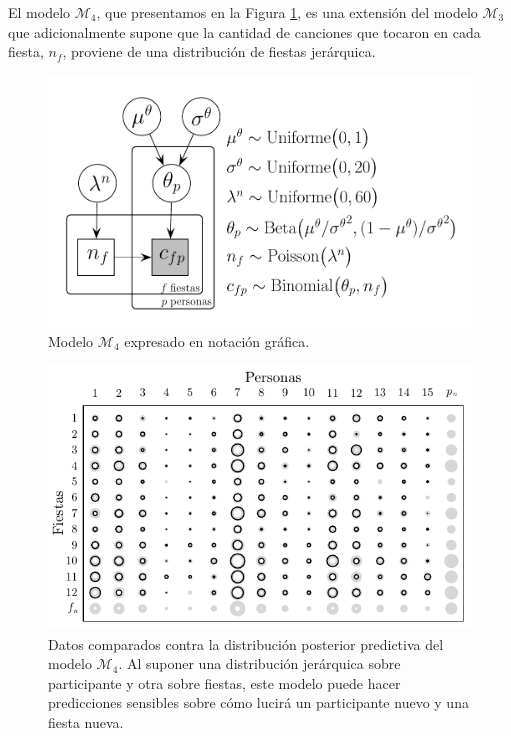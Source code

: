 \documentclass{article}
\begin{document}
\indent El modelo $\mathcal M_4$, que presentamos en la Figura \ref{fig:m_4}, es una extensión del modelo $\mathcal M_3$ que adicionalmente supone que la cantidad de canciones que tocaron en cada fiesta, $n_f$, proviene de una distribución de fiestas jerárquica. \\

\begin{figure}[H]
\centerline{\includegraphics[width=1\textwidth]{m_4.pdf}}
\caption{Modelo $\mathcal M_4$ expresado en notación gráfica.}
\label{fig:m_4}
\end{figure}

\begin{figure}[H]
\centering
\setlength\fboxsep{0pt}
\setlength\fboxrule{0.5pt}
\includegraphics[trim=0cm 0cm 0cm 0cm, clip=true, width=1\textwidth]	{data_pos_pred_m4.pdf}
\caption{Datos comparados contra la distribución posterior predictiva del modelo $\mathcal M_4$. Al suponer una distribución jerárquica sobre participante y otra sobre fiestas, este modelo puede hacer predicciones sensibles sobre cómo lucirá un participante nuevo y una fiesta nueva.}
\label{fig:data_4}
\end{figure}
	
\end{document}
